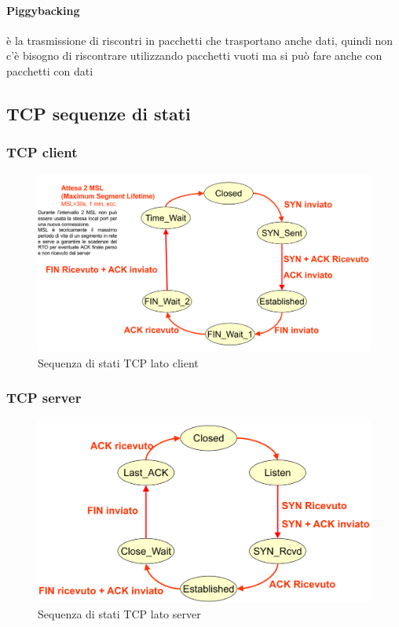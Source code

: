 \paragraph{Piggybacking} è la trasmissione di riscontri in
pacchetti che trasportano anche dati, quindi non c'è bisogno di riscontrare utilizzando pacchetti vuoti ma si può fare anche con pacchetti con dati 
\newpage
\subsection{TCP sequenze di stati}
\subsubsection{TCP client}
\begin{figure}[h!]
    \centering
    \includegraphics[width=1.1\textwidth]{images/tcpstaticlient.png}
    \caption{Sequenza di stati TCP lato client}
    \label{fig:tcpstaticlient}
\end{figure}
\subsubsection{TCP server}

\begin{figure}[h!]
    \centering
    \includegraphics[width=1\textwidth]{images/tcpstatiserver.png}
    \caption{Sequenza di stati TCP lato server}
    \label{fig:tcpstateserver}
    \end{figure}
\newpage

